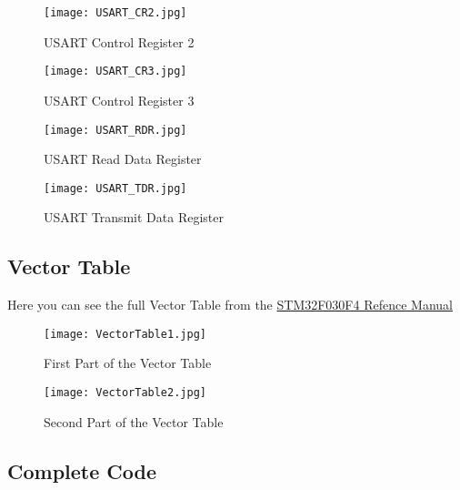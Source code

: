 \pagebreak

\begin{figure}[hbt!]
	\texttt{[image: USART\_CR2.jpg]}
	\caption{USART Control Register 2}
	\label{fig:USART_CR2}
\end{figure}

\begin{figure}[hbt!]
	\texttt{[image: USART\_CR3.jpg]}
	\caption{USART Control Register 3}
	\label{fig:USART_CR3}
\end{figure}

\pagebreak

\begin{figure}[hbt!]
	\texttt{[image: USART\_RDR.jpg]}
	\caption{USART Read Data Register}
	\label{fig:USART_RDR}
\end{figure}

\pagebreak

\begin{figure}[hbt!]
	\texttt{[image: USART\_TDR.jpg]}
	\caption{USART Transmit Data Register}
	\label{fig:USART_TDR}
\end{figure}

\pagebreak

\subsection{Vector Table}
\label{fig:VecTab}

Here you can see the full Vector Table from the \href{https://www.st.com/resource/en/reference_manual/dm00091010-stm32f030x4x6x8xc-and-stm32f070x6xb-advanced-armbased-32bit-mcus-stmicroelectronics.pdf}{STM32F030F4 Refence Manual}

\begin{figure}[hbt!]
	\texttt{[image: VectorTable1.jpg]}
	\caption{First Part of the Vector Table}
	\label{fig:VecTab1}
\end{figure}

\pagebreak

\begin{figure}[hbt!]
	\texttt{[image: VectorTable2.jpg]}
	\caption{Second Part of the Vector Table}
	\label{fig:VecTab2}
\end{figure}

\pagebreak

\subsection{Complete Code}
\label{subsec:CompCodeRef}

